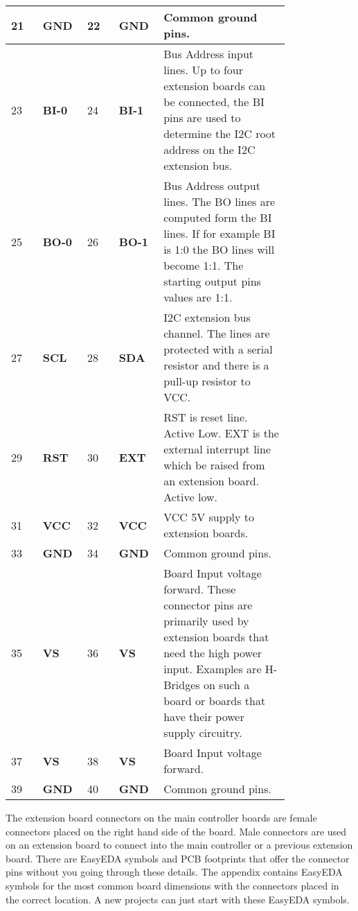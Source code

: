 \begin{center}
\begin{longtable}{@{}|p{0.1\linewidth}|p{0.1\linewidth}|p{0.1\linewidth}|p{0.1\linewidth}|p{0.4\linewidth}|@{}}
        21 & \textbf{GND} & 22 & \textbf{GND} & Common ground pins. \\
        \midrule
        23 & \textbf{BI-0} & 24 & \textbf{BI-1} & Bus Address input lines. Up to four extension boards can be connected, the BI pins are used to determine the I2C root address on the I2C extension bus. \\ 
        \midrule
        25 & \textbf{BO-0} & 26 & \textbf{BO-1} & Bus Address output lines. The BO lines are computed form the BI lines. If for example BI is 1:0 the BO lines will become 1:1. The starting output pins values are 1:1. \\ 
        \midrule
        27 & \textbf{SCL} &  28 & \textbf{SDA} & I2C extension bus channel.  The lines are protected with a serial resistor and there is a pull-up resistor to VCC. \\
        \midrule
        29 & \textbf{RST} & 30 & \textbf{EXT} & RST is reset line. Active Low. EXT is the external interrupt line which be raised from an extension board. Active low. \\
        \midrule
        31 & \textbf{VCC} & 32 & \textbf{VCC} & VCC 5V supply to extension boards. \\
        \midrule
        33 & \textbf{GND} & 34 & \textbf{GND} & Common ground pins. \\
        \midrule
        35 & \textbf{VS} & 36 & \textbf{VS} & Board Input voltage forward. These  connector pins are primarily used by extension boards that need the high power input. Examples  are H-Bridges on such a board or boards that have their power supply circuitry. \\
        37 & \textbf{VS} & 38 & \textbf{VS} & Board Input voltage forward. \\
        \midrule
        39 & \textbf{GND} & 40 & \textbf{GND} & Common ground pins. \\
    \end{longtable}  
\end{center}

The extension board connectors on the main controller boards are female connectors placed on the right hand side of the board. Male connectors are used on an extension board to connect into the main controller or a previous extension board. There are EasyEDA symbols and PCB footprints that offer the connector pins without you going through these details. The appendix contains EasyEDA symbols for the most common board dimensions with the connectors placed in the correct location. A new projects can just start with these EasyEDA symbols.


